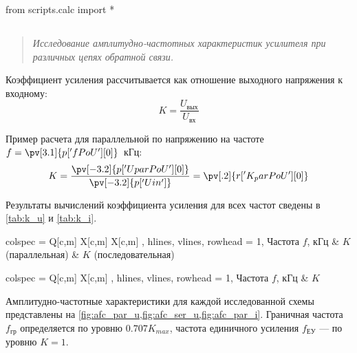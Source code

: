 \begin{python}
from scripts.calc import *
\end{python}

\subsection*{  }
\begin{quote} 
    \textit{Исследование амплитудно-частотных характеристик усилителя при различных цепях обратной связи.} 
\end{quote}

Коэффициент усиления рассчитывается как отношение выходного напряжения к входному:
\begin{equation}
    K = \frac{U_{вых}}{U_{вх}}
\end{equation}

Пример расчета для параллельной по напряжению на частоте $f = \pv[3.1]{p['fPoU'][0]}$~кГц:
\begin{equation}
    K = \frac{\pv[-3.2]{p['UparPoU'][0]}}{\pv[-3.2]{p['Uin']}} = \pv[.2]{r['K_parPoU'][0]}
\end{equation}

Результаты вычислений коэффициента усиления для всех частот сведены в \cref{tab:k_u} и \cref{tab:k_i}.

\begin{longtblr}[
    caption = {Коэффициенты усиления (по напряжению)},
    label = {tab:k_u},
]{
    colspec = { Q[c,m] X[c,m] X[c,m] },
    hlines, vlines,
    rowhead = 1,
}
    {Частота $f$, кГц} & {$K$ (параллельная)} & {$K$ (последовательная)} \\
\end{longtblr}

\begin{longtblr}[
    caption = {Коэффициенты усиления (параллельная по току)},
    label = {tab:k_i},
]{
    colspec = { Q[c,m] X[c,m] },
    hlines, vlines,
    rowhead = 1,
}
    {Частота $f$, кГц} & {$K$} \\
\end{longtblr}

Амплитудно-частотные характеристики для каждой исследованной схемы представлены на \cref{fig:afc_par_u,fig:afc_ser_u,fig:afc_par_i}. Граничная частота $f_{гр}$ определяется по уровню $0.707 K_{max}$, частота единичного усиления $f_{ЕУ}$ --- по уровню $K = 1$. 

